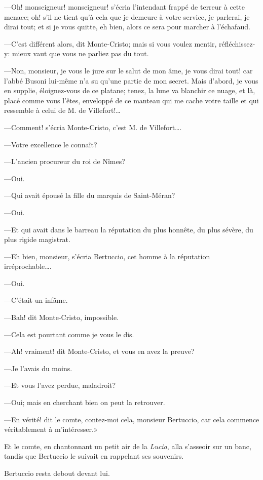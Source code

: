 —Oh! monseigneur! monseigneur! s'écria l'intendant frappé de terreur à cette menace; oh! s'il ne tient qu'à cela que je demeure à votre service, je parlerai, je dirai tout; et si je vous quitte, eh bien, alors ce sera pour marcher à l'échafaud.  

—C'est différent alors, dit Monte-Cristo; mais si vous voulez mentir, réfléchissez-y: mieux vaut que vous ne parliez pas du tout. 

—Non, monsieur, je vous le jure sur le salut de mon âme, je vous dirai tout! car l'abbé Busoni lui-même n'a su qu'une partie de mon secret. Mais d'abord, je vous en supplie, éloignez-vous de ce platane; tenez, la lune va blanchir ce nuage, et là, placé comme vous l'êtes, enveloppé de ce manteau qui me cache votre taille et qui ressemble à celui de M. de Villefort!\dots 

—Comment! s'écria Monte-Cristo, c'est M. de Villefort\dots. 

—Votre excellence le connaît?  

—L'ancien procureur du roi de Nîmes? 

—Oui. 

—Qui avait épousé la fille du marquis de Saint-Méran? 

—Oui. 

—Et qui avait dans le barreau la réputation du plus honnête, du plus sévère, du plus rigide magistrat. 

—Eh bien, monsieur, s'écria Bertuccio, cet homme à la réputation irréprochable\dots. 

—Oui. 

—C'était un infâme. 

—Bah! dit Monte-Cristo, impossible. 

—Cela est pourtant comme je vous le dis. 

—Ah! vraiment! dit Monte-Cristo, et vous en avez la preuve? 

—Je l'avais du moins. 

—Et vous l'avez perdue, maladroit? 

—Oui; mais en cherchant bien on peut la retrouver. 

—En vérité! dit le comte, contez-moi cela, monsieur Bertuccio, car cela commence véritablement à m'intéresser.» 

Et le comte, en chantonnant un petit air de la \textit{Lucia}, alla s'asseoir sur un banc, tandis que Bertuccio le suivait en rappelant ses souvenirs. 

Bertuccio resta debout devant lui. 